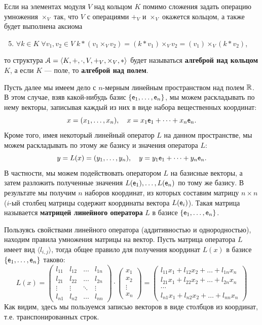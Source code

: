 Если на элементах модуля $V$ над кольцом $K$ помимо сложения задать операцию умножения $\times_V$ так, что $V$ с операциями $+_V$ и $\times_V$ окажется кольцом, а также будет выполнена аксиома
\begin{enumerate}[Mod1]\setcounter{enumi}{4}
\item $\forall k\in K\;\forall v_1,v_2\in V\; k*(v_1\times_V v_2) = (k*v_1)\times_V v_2 = (v_1)\times_V(k*v_2)$,
\end{enumerate}
то структура $\mathcal A = \langle K,+,\cdot,V,+_V,\times_V,*\rangle$ будет называться \textbf{алгеброй над кольцом} $K$, а если $K$ --- поле, то \textbf{алгеброй над полем}.

Пусть далее мы имеем дело с $n$-мерным линейным пространством над полем $\mathbb R$. В этом случае, взяв какой-нибудь базис  $\{\mathsf e_1,\dots,\mathsf e_n\}$, мы можем раскладывать по нему векторы, записывая каждый из них в виде набора вещественных координат:
$$
x = (x_1,\dots,x_n),\quad x=x_1\mathsf e_1+\dots+x_n\mathsf e_n.
$$
Кроме того, имея некоторый линейный оператор $L$ на данном пространстве, мы можем раскладывать по этому же базису и значения оператора $L$:
$$
y=L(x) = (y_1,\dots,y_n),\quad y=y_1\mathsf e_1+\dots+y_n\mathsf e_n.
$$
В частности, мы можем подействовать оператором $L$ на базисные векторы, а затем разложить полученные значения $L(\mathsf e_1),\dots,L(\mathsf e_n)$ по тому же базису. В результате мы получим $n$ наборов координат, из которых составим матрицу $n\times n$ ($i$-ый столбец матрицы содержит координаты вектора $L(\mathsf e_i)$). Такая матрица называется \textbf{матрицей линейного оператора} $L$ в базисе $\{\mathsf e_1,\dots,\mathsf e_n\}$.

Пользуясь свойствами линейного оператора (аддитивностью и однородностью), находим правила умножения матрицы на вектор. Пусть матрица оператора $L$ имеет вид $\langle l_{i,j}\rangle$, тогда общее правило для получения координат $L(x)$ в базисе $\{\mathsf e_1,\dots,\mathsf e_n\}$ таково:
\begin{equation}\label{matrix}
L(x) = 
\begin{pmatrix}
l_{11} & l_{12} & \dots & l_{1n} \\
l_{21} & l_{22} & \dots & l_{2n} \\
\vdots & \vdots & \ddots & \vdots \\
l_{n1} & l_{n2} & \dots & l_{nn}
\end{pmatrix}\cdot 
\begin{pmatrix}
x_1 \\
x_2 \\
\vdots \\
x_n
\end{pmatrix} = 
\begin{pmatrix}
l_{11}x_1 + l_{12}x_2 + \dots + l_{1n}x_n \\
l_{21}x_1 + l_{22}x_2 + \dots + l_{2n}x_n \\
\cdots \\
l_{n1}x_1 + l_{n2}x_2 + \dots + l_{nn}x_n
\end{pmatrix}
\end{equation}
Как видим, здесь мы пользуемся записью векторов в виде столбцов из координат, т.е. транспонированных строк.



